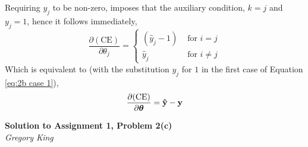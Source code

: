 \documentclass[letter,12pt]{article}
\newcommand{\myhwtitle}[3]
{\begin{center}
{\large {\bf Solution to Assignment {#1}, Problem {#2}}}\\
\medskip 
{\it {#3}} %
\end{center}}
\begin{document}
Requiring $y_{j}$ to be non-zero, imposes that the auxiliary condition, $k=j$ and $y_{j}=1$, hence it follows immediately,
\begin{equation}
\frac{\partial(\textrm{CE})}{\partial{\theta_{j}}} = \begin{cases}
(\hat{y}_{j} - 1)&\text{ for }i=j\label{eq:2b case 1} \\
\hat{y}_{j}&\text{ for }i\neq j
\end{cases}
\end{equation}
Which is equivalent to (with the substitution $y_{j}$ for $1$ in the first case of Equation \ref{eq:2b case 1}),
\begin{equation}
\frac{\partial(\textrm{CE})}{\partial{\boldsymbol\theta}} = \bf{\hat{y}} - \bf{y}
\end{equation}

\clearpage

\myhwtitle{1}{2(c)}{Gregory King}
\bigskip
\end{document}

